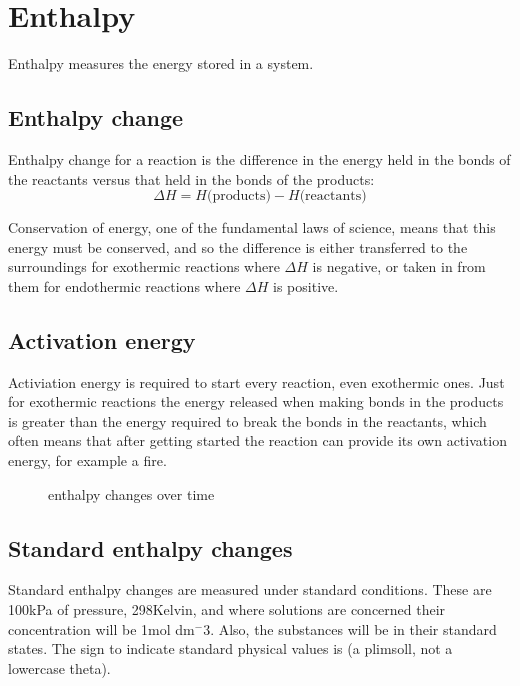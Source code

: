 \section{Enthalpy}
Enthalpy measures the energy stored in a system.

\subsection{Enthalpy change}
Enthalpy change for a reaction is the difference in the energy held in the bonds of the reactants versus that held in the bonds of the products:
\begin{equation}
	\Delta H = H\textrm{(products)} - H\textrm{(reactants)}
\end{equation}

Conservation of energy, one of the fundamental laws of science, means that this energy must be conserved, and so the difference is either transferred to the surroundings for exothermic reactions where $\Delta H$ is negative, or taken in from them for endothermic reactions where $\Delta H$ is positive.

\subsection{Activation energy}
Activiation energy is required to start every reaction, even exothermic ones. Just for exothermic reactions the energy released when making bonds in the products is greater than the energy required to break the bonds in the reactants, which often means that after getting started the reaction can provide its own activation energy, for example a fire.

\begin{figure}[ht]
    \centering
    \caption{enthalpy changes over time}
    \label{fig:enthalpy-changes-over-time}
\end{figure}

\subsection{Standard enthalpy changes}
Standard enthalpy changes are measured under standard conditions. These are 100kPa of pressure, 298\textdegree Kelvin, and where solutions are concerned their concentration will be 1mol dm$^-3$. Also, the substances will be in their standard states. The sign to indicate standard physical values is \standardstate (a plimsoll, not a lowercase theta).

